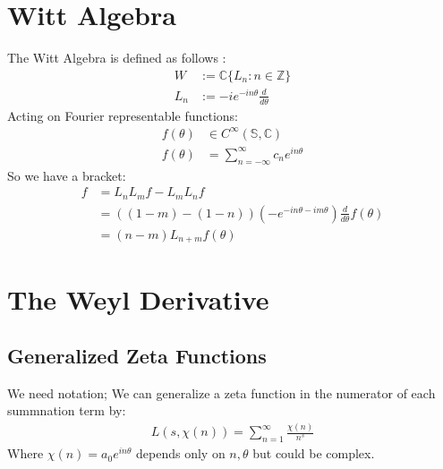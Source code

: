 \documentclass{artjltcopy}
\newcommand{\?}{\textbackslash}
\newcommand{\C}{\mathbb{C}}
\newcommand{\Z}{\mathbb{Z}}
\begin{document}
\section{Witt Algebra}
The Witt Algebra is defined as follows \cite{Schottenloher1997} \cite{Nam1999}:
\begin{align*}
W &:= \C \{L_n: n \in \Z\} \\
L_n &:= -i e^{-i n \theta} \frac{d}{d \theta}
\end{align*}
Acting on Fourier representable functions:
\begin{align*}
f(\theta) &\in C^\infty (\mathbb{S},\C) \\
f(\theta) &=\sum_{n=-\infty}^{\infty} c_n e^{i n \theta}
\end{align*} 
So we have a bracket:
\begin{align*}
  [L_n, L_m] f &= L_n L_m f - L_m L_n f \\
  &= ((1-m)-(1-n))(- e^{-i n \theta - i m \theta}) \frac{d}{d \theta} f(\theta) \\
  &=(n-m)L_{n+m} f(\theta)
\end{align*}
\section{The Weyl Derivative}
\subsection{Generalized Zeta Functions}
We need notation; We can generalize a zeta function in the numerator of each summnation term by:
\begin{align*}
  L(s,\chi(n)) = \sum_{n=1}^{\infty}\frac{\chi(n)}{n^s}
\end{align*}
Where $\chi(n)=a_0e^{in \theta}$ depends only on $n,\theta$ but could be complex. 
\end{document}

